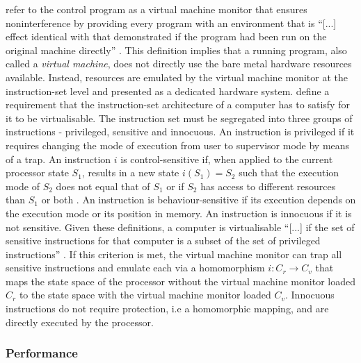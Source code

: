 \textcite{10.1145/361011.361073} refer to the control program as a virtual machine monitor that 
ensures noninterference by providing every program with an environment that is \enquote{[...] effect
identical with that demonstrated if the program had been run on the original machine directly} 
\cite[2]{10.1145/361011.361073}. This definition implies that a running program, also called a 
\textit{virtual machine}, does not directly use the bare metal hardware resources available. Instead,
resources are emulated by the virtual machine monitor at the instruction-set level and presented as a
dedicated hardware system. \textcite{10.1145/361011.361073} define a requirement that the 
instruction-set architecture of a computer has to satisfy for it to be virtualisable. The instruction
set must be segregated into three groups of instructions - privileged, sensitive and innocuous. An 
instruction is privileged if it requires changing the mode of execution from user to supervisor mode 
by means of a trap. An instruction $i$ is control-sensitive if, when applied to the current processor
state $S_1$, results in a new state $i(S_{1}) = S_{2}$ such that the execution mode of $S_{2}$ does 
not equal that of $S_{1}$ or if $S_{2}$ has access to different resources than $S_1$ or both 
\cite{10.1145/361011.361073}. An instruction is behaviour-sensitive if its execution depends on the 
execution mode or its position in memory. An instruction is innocuous if it is not sensitive. Given 
these definitions, a computer is virtualisable \enquote{[...] if the set of sensitive instructions
for that computer is a subset of the set of privileged instructions} \cite[6]{10.1145/361011.361073}.
If this criterion is met, the virtual machine monitor can trap all sensitive instructions and emulate 
each via a homomorphism $i: C_{r} \rightarrow C_{v}$ that maps the state space of the processor without
the virtual machine monitor loaded $C_{r}$ to the state space with the virtual machine monitor loaded 
$C_{v}$. Innocuous instructions do not require protection, i.e a homomorphic mapping, and are directly
executed by the processor.


\subsubsection{Performance}
